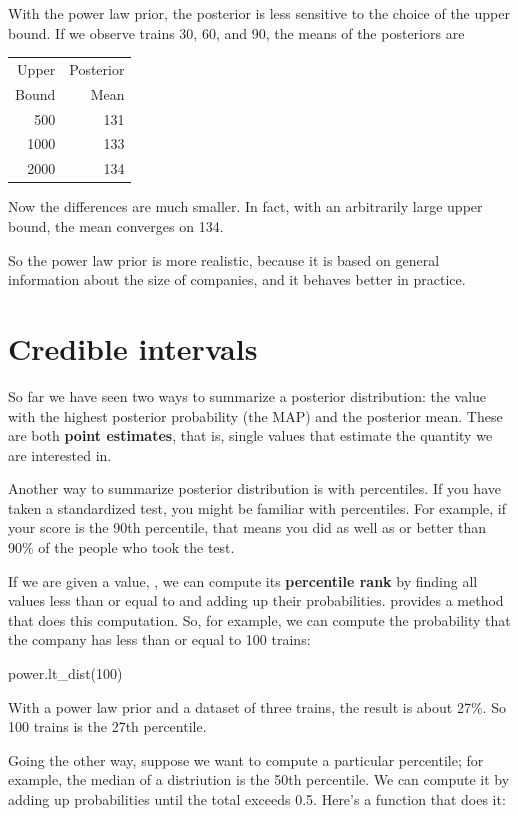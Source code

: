 \documentclass[12pt]{book}
\theoremstyle{exercise}
\begin{document}
With the power law prior, the posterior is less sensitive to the choice of the upper bound.
If we observe trains 30, 60, and 90, the means of the posteriors are

\begin{tabular}{rr}
\toprule
Upper & Posterior \\
Bound & Mean \\
\midrule
  500 & 131 \\
  1000 & 133 \\
  2000 & 134 \\
\bottomrule
\end{tabular}

Now the differences are much smaller.  In fact,
with an arbitrarily large upper bound, the mean converges on 134.

So the power law prior is more realistic, because it is based on
general information about the size of companies, and it behaves better in practice.


\section{Credible intervals}
\label{credible}

So far we have seen two ways to summarize a posterior distribution: the value with the highest posterior probability (the MAP) and the posterior mean.
These are both {\bf point estimates}, that is, single values that estimate the quantity we are interested in.

Another way to summarize posterior distribution is with percentiles.
If you have taken a standardized test, you might be familiar with percentiles.
For example, if your score is the 90th percentile, that means you did as well as or better than 90\% of the people who took the test.

If we are given a value, , we can compute its {\bf percentile rank} by finding all values less than or equal to  and adding up their probabilities.
 provides a method that does this computation.
So, for example, we can compute the probability that the company has less than or equal to 100 trains:

\begin{code}
power.lt_dist(100)
\end{code}

With a power law prior and a dataset of three trains, the result is about 27\%.
So 100 trains is the 27th percentile.

Going the other way, suppose we want to compute a particular percentile; for example, the median of a distriution is the 50th percentile.
We can compute it by adding up probabilities until the total exceeds 0.5.
Here's a function that does it:
\end{document}
